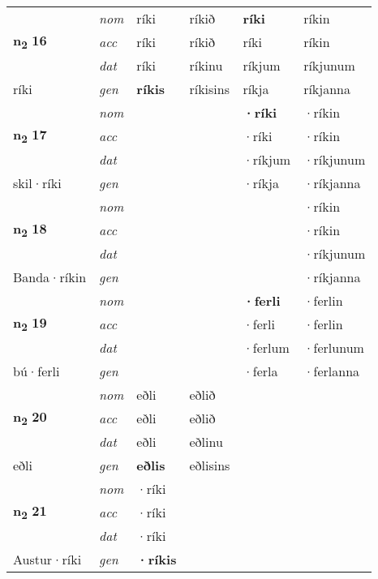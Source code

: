 \begin{longtable}[l]{X>{\footnotesize\itshape}XXXXX}
\multirow{3}{*}{{{\textbf{n{\textsubscript{2}}} \Large{\textbf{16}}}}} & nom & ríki & ríkið & \textbf{ríki} & ríkin \\*
 & acc & ríki & ríkið & ríki & ríkin \\*
 & dat & ríki & ríkinu & ríkjum & ríkjunum \\*
 {\footnotesize{ríki}} & gen & \textbf{ríkis} & ríkisins & ríkja & ríkjanna \\
\midrule

\multirow{3}{*}{{{\textbf{n{\textsubscript{2}}} \Large{\textbf{17}}}}} & nom &  &  & \textbf{·ríki} & ·ríkin \\*
 & acc &  &  & ·ríki & ·ríkin \\*
 & dat &  &  & ·ríkjum & ·ríkjunum \\*
 {\footnotesize{skil\allowbreak ·ríki}} & gen & \textbf{} &  & ·ríkja & ·ríkjanna \\
\midrule

\multirow{3}{*}{{{\textbf{n{\textsubscript{2}}} \Large{\textbf{18}}}}} & nom &  &  & \textbf{} & ·ríkin \\*
 & acc &  &  &  & ·ríkin \\*
 & dat &  &  &  & ·ríkjunum \\*
 {\footnotesize{Banda\allowbreak ·ríkin}} & gen & \textbf{} &  &  & ·ríkjanna \\
\midrule

\multirow{3}{*}{{{\textbf{n{\textsubscript{2}}} \Large{\textbf{19}}}}} & nom &  &  & \textbf{·ferli} & ·ferlin \\*
 & acc &  &  & ·ferli & ·ferlin \\*
 & dat &  &  & ·ferlum & ·ferlunum \\*
 {\footnotesize{bú\allowbreak ·ferli}} & gen & \textbf{} &  & ·ferla & ·ferlanna \\
\midrule

\multirow{3}{*}{{{\textbf{n{\textsubscript{2}}} \Large{\textbf{20}}}}} & nom & eðli & eðlið & \textbf{} &  \\*
 & acc & eðli & eðlið &  &  \\*
 & dat & eðli & eðlinu &  &  \\*
 {\footnotesize{eðli}} & gen & \textbf{eðlis} & eðlisins &  &  \\
\midrule

\multirow{3}{*}{{{\textbf{n{\textsubscript{2}}} \Large{\textbf{21}}}}} & nom & ·ríki &  & \textbf{} &  \\*
 & acc & ·ríki &  &  &  \\*
 & dat & ·ríki &  &  &  \\*
 {\footnotesize{Austur\allowbreak ·ríki}} & gen & \textbf{·ríkis} &  &  &  \\
\midrule


\end{longtable}
